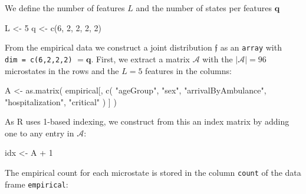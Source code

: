 \documentclass[
]{article}
\newenvironment{Shaded}{\begin{snugshade}}{\end{snugshade}}
\newcommand{\DecValTok}[1]{\textcolor[rgb]{0.00,0.00,0.81}{#1}}
\newcommand{\FunctionTok}[1]{\textcolor[rgb]{0.00,0.00,0.00}{#1}}
\newcommand{\NormalTok}[1]{#1}
\newcommand{\OtherTok}[1]{\textcolor[rgb]{0.56,0.35,0.01}{#1}}
\newcommand{\SpecialCharTok}[1]{\textcolor[rgb]{0.00,0.00,0.00}{#1}}
\newcommand{\StringTok}[1]{\textcolor[rgb]{0.31,0.60,0.02}{#1}}
\newcommand{\abs}[1]{\left\vert#1\right\vert} %
\newcommand{\prob}[1]{\mathfrak{#1}}
\newcommand{\dimstatespace}{{\abs{\mathcal{A}}}}
\begin{document}
We define the number of features \(L\) and the number of states per
features \(\mathbf q\)

\begin{Shaded}
\begin{Highlighting}[]
\NormalTok{L }\OtherTok{\textless{}{-}} \DecValTok{5}
\NormalTok{q }\OtherTok{\textless{}{-}} \FunctionTok{c}\NormalTok{(}\DecValTok{6}\NormalTok{, }\DecValTok{2}\NormalTok{, }\DecValTok{2}\NormalTok{, }\DecValTok{2}\NormalTok{, }\DecValTok{2}\NormalTok{)}
\end{Highlighting}
\end{Shaded}

From the empirical data we construct a joint distribution \(\prob f\) as
an \texttt{array} with \texttt{dim\ =\ c(6,2,2,2)} \(=\mathbf q\).
First, we extract a matrix \(\mathcal A\) with the
\(\dimstatespace = 96\) microstates in the rows and the \(L = 5\)
features in the columns:

\begin{Shaded}
\begin{Highlighting}[]
\NormalTok{A }\OtherTok{\textless{}{-}} \FunctionTok{as.matrix}\NormalTok{(}
\NormalTok{  empirical[, }
    \FunctionTok{c}\NormalTok{(}
      \StringTok{"ageGroup"}\NormalTok{, }
      \StringTok{"sex"}\NormalTok{, }
      \StringTok{"arrivalByAmbulance"}\NormalTok{, }
      \StringTok{"hospitalization"}\NormalTok{, }
      \StringTok{"critical"}
\NormalTok{    )}
\NormalTok{  ]}
\NormalTok{)}
\end{Highlighting}
\end{Shaded}

As R uses 1-based indexing, we construct from this an index matrix by
adding one to any entry in \(\mathcal A\):

\begin{Shaded}
\begin{Highlighting}[]
\NormalTok{idx }\OtherTok{\textless{}{-}}\NormalTok{ A }\SpecialCharTok{+} \DecValTok{1}
\end{Highlighting}
\end{Shaded}

The empirical count for each microstate is stored in the column
\texttt{count} of the data frame \texttt{empirical}:

\begin{Shaded}
\end{Shaded}
\end{document}
